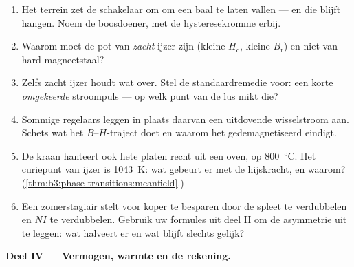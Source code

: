 \begin{problem}
\begin{enumerate}[resume]
  \item Het terrein zet de schakelaar om om een baal te laten vallen --- en die blijft
        hangen. Noem de boosdoener, met de hysteresekromme erbij.
  \item Waarom moet de pot van \emph{zacht} ijzer zijn (kleine
        $H_{\text{c}}$, kleine $B_{\text{r}}$) en niet van hard
        magneetstaal?
  \item Zelfs zacht ijzer houdt wat  over. Stel de
        standaardremedie voor: een korte \emph{omgekeerde} stroompuls ---
        op welk punt van de lus mikt die?
  \item Sommige regelaars leggen in plaats daarvan een uitdovende wisselstroom aan.
        Schets wat het $B$--$H$-traject doet en waarom
        het gedemagnetiseerd eindigt.
  \item De kraan hanteert ook hete platen recht uit een oven,
        op \qty{800}{\celsius}. Het curiepunt van ijzer is
        \qty{1043}{K}: wat gebeurt er met de hijskracht, en waarom?
        (\cref{thm:b3:phase-transitions:meanfield}.)
  \item Een zomerstagiair stelt voor koper te besparen door
        de spleet te verdubbelen en $NI$ te verdubbelen. Gebruik uw formules uit deel II om
        de asymmetrie uit te leggen: wat halveert er en wat blijft slechts gelijk?
\end{enumerate}

\medskip\noindent\textbf{Deel IV --- Vermogen, warmte en de rekening.}


\end{problem}
